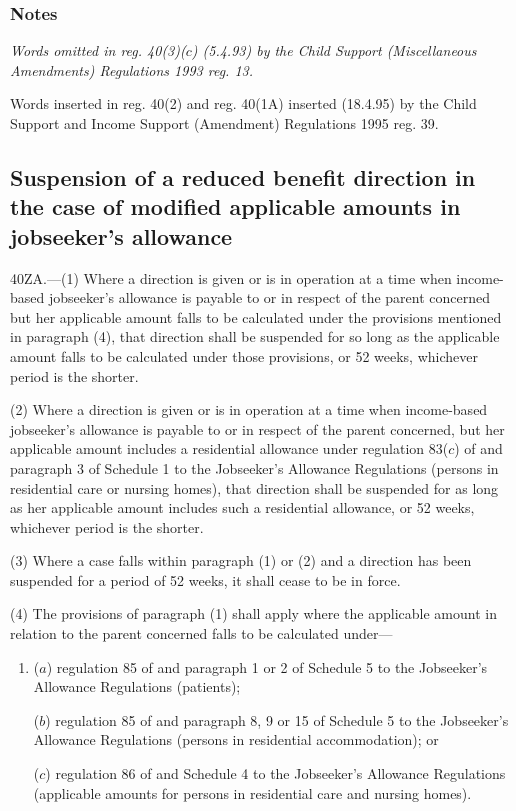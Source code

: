 \documentclass[a4paper]{article}
\newcommand\amendment[1]{\subsubsection*{Notes}{\itshape\frenchspacing\footnotesize #1 \par}}
\begin{document}
\amendment{
Words omitted in reg. 40(3)($c$) (5.4.93) by the Child Support (Miscellaneous Amendments) Regulations 1993 reg. 13.

Words inserted in reg. 40(2) and reg. 40(1A) inserted (18.4.95) by the Child Support and Income Support (Amendment) Regulations 1995 reg. 39.
}

\subsection[40ZA. Suspension of a reduced benefit direction in the case of modified applicable amounts in jobseeker’s allowance]{Suspension of a reduced benefit direction in the case of modified applicable amounts in jobseeker’s allowance}

40ZA.—(1) Where a direction is given or is in operation at a time when income-based jobseeker’s allowance is payable to or in respect of the parent concerned but her applicable amount falls to be calculated under the provisions mentioned in paragraph (4), that direction shall be suspended for so long as the applicable amount falls to be calculated under those provisions, or 52 weeks, whichever period is the shorter.

(2) Where a direction is given or is in operation at a time when income-based jobseeker’s allowance is payable to or in respect of the parent concerned, but her applicable amount includes a residential allowance under regulation 83($c$) of and paragraph 3 of Schedule 1 to the Jobseeker’s Allowance Regulations (persons in residential care or nursing homes), that direction shall be suspended for as long as her applicable amount includes such a residential allowance, or 52 weeks, whichever period is the shorter.

(3) Where a case falls within paragraph (1) or (2) and a direction has been suspended for a period of 52 weeks, it shall cease to be in force.

(4) The provisions of paragraph (1) shall apply where the applicable amount in relation to the parent concerned falls to be calculated under—
\begin{enumerate}\item[]
($a$) regulation 85 of and paragraph 1 or 2 of Schedule 5 to the Jobseeker’s Allowance Regulations (patients);

($b$) regulation 85 of and paragraph 8, 9 or 15 of Schedule 5 to the Jobseeker’s Allowance Regulations (persons in residential accommodation); or

($c$) regulation 86 of and Schedule 4 to the Jobseeker’s Allowance Regulations (applicable amounts for persons in residential care and nursing homes).
\end{enumerate}
\end{document}
